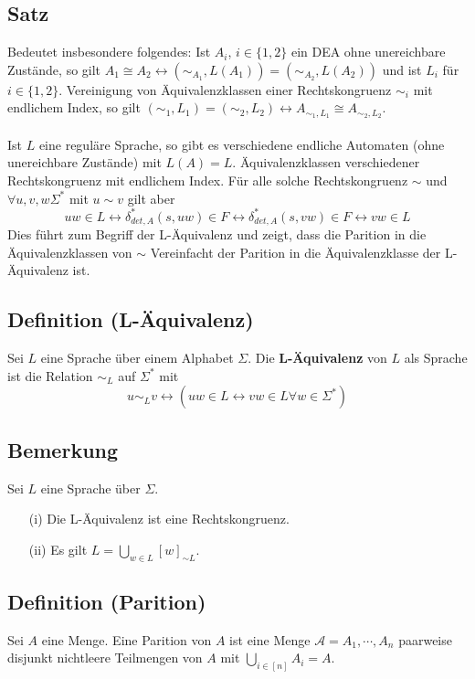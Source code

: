 \subsection{Satz} Bedeutet insbesondere folgendes: Ist $A_i$, $i \in \{1, 2\}$ ein DEA ohne unereichbare Zustände, so gilt $A_1 \cong  A_2 \leftrightarrow (\sim_{A_1}, L(A_1)) = (\sim_{A_2}, L(A_2))$ und ist $L_i$ für $i \in \{1, 2\}$. Vereinigung von Äquivalenzklassen einer Rechtskongruenz $\sim_i$ mit endlichem Index, so gilt $(\sim_1, L_1) = (\sim_2, L_2) \leftrightarrow A_{\sim_1,L_1} \cong A_{\sim_2,L_2}$. \\\\ Ist $L$ eine reguläre Sprache, so gibt es verschiedene endliche Automaten (ohne unereichbare Zustände) mit $L(A) = L$. Äquivalenzklassen verschiedener Rechtskongruenz mit endlichem Index. Für alle solche Rechtskongruenz $\sim$ und $\forall u, v, w \Sigma^*$ mit $u \sim v$ gilt aber \[uw \in L \leftrightarrow \delta^*_{det, A} (s, uw) \in F \leftrightarrow \delta^*_{det, A} (s, vw) \in F \leftrightarrow vw \in L\] Dies führt zum Begriff der L-Äquivalenz und zeigt, dass die Parition in die Äquivalenzklassen von $\sim$ Vereinfacht der Parition in die Äquivalenzklasse der L-Äquivalenz ist.

\subsection{Definition (L-Äquivalenz)} Sei $L$ eine Sprache über einem Alphabet $\Sigma$. Die \textbf{L-Äquivalenz} von $L$ als Sprache ist die Relation $\sim_L$ auf $\Sigma^*$ mit \[u \sim_L v \leftrightarrow (uw \in L \leftrightarrow vw \in L \forall w \in \Sigma^*)\] 

\subsection{Bemerkung} Sei $L$ eine Sprache über $\Sigma$. 
\begin{itemize}
  \item [(i)] Die L-Äquivalenz ist eine Rechtskongruenz.
  \item [(ii)] Es gilt $L = \bigcup \limits_{w \in L}[w]_{\sim L}$.
\end{itemize}

\subsection{Definition (Parition)} Sei $A$ eine Menge. Eine Parition von $A$ ist eine Menge $\mathcal{A} = {A_1, \cdots, A_n}$ paarweise disjunkt nichtleere Teilmengen von $A$ mit $\bigcup \limits_{i \in [n]} A_i = A$.


